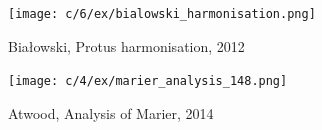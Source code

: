 \begin{example}
  \centering
  \texttt{[image: c/6/ex/bialowski\_harmonisation.png]}
  \caption{Białowski, Protus harmonisation, 2012}
  \label{mus:bialowski_harmonisation}
\end{example}

\vspace*{\fill}

\newpage

\vspace*{\fill}

\begin{example}
  \centering
  \texttt{[image: c/4/ex/marier\_analysis\_148.png]}
  \caption{Atwood, Analysis of Marier, 2014}
  \label{mus:marier_analysis}
\end{example}

\vspace*{\fill}
